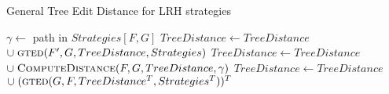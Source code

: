 
\begin{algorithm}
  \caption{General Tree Edit Distance for LRH strategies}
  \label{alg:gted}
  \begin{algorithmic}[1]
      \State $\gamma \gets$ path in $Strategies[F, G]$
          \State $TreeDistance \gets TreeDistance$
          \Indent
            \State $\cup \; \Call{gted}{F', G, TreeDistance, Strategies}$
          \EndIndent
        \EndFor
        \State $TreeDistance \gets TreeDistance$
        \Indent
          \State $\cup \; \Call{ComputeDistance}{F, G, TreeDistance, \gamma}$
        \EndIndent
      \Else
        \State $TreeDistance \gets TreeDistance$
        \Indent
          \State $\cup \; (\Call{gted}{G, F, TreeDistance^{T}, Strategies^{T}})^{T}$
        \EndIndent
      \EndIf
      \State {}
    \EndProcedure
  \end{algorithmic}
\end{algorithm}


